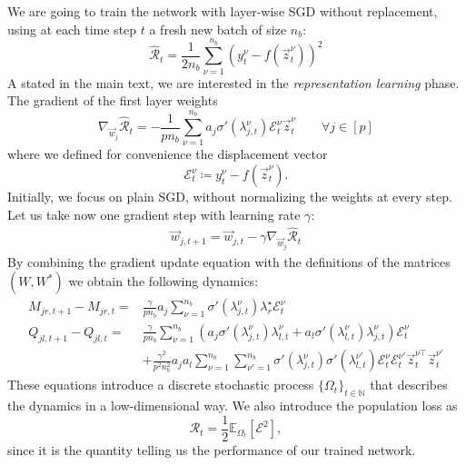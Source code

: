 We are going to train the network with layer-wise SGD without replacement, using at each time step \(t\) a fresh new batch of size $n_b$: 
\[
    \hat{\mathcal{R}}_t = \frac{1}{2n_b} \sum_{\nu=1}^{n_b}(y^\nu_t - f(\vec z^\nu_t))^2
\]
A stated in the main text, we are interested in the \emph{representation learning} phase. The gradient of the first layer weights
\[
    \nabla_{\vec w_j} \hat{\mathcal{R}}_t = -\frac{1}{pn_b} \sum_{\nu=1}^{n_b} a_j \sigma'(\lambda^\nu_{j,t})\mathcal{E}_t^\nu \vec{z}^\nu_t \qquad \forall j \in [p]
\]
where we defined for convenience the displacement vector 
\begin{equation*}
\mathcal{E}_t^{\nu} \coloneqq y^\nu_t-f{(\vec z^\nu_t)}.
\end{equation*}
Initially, we focus on plain SGD, without normalizing the weights at every step. Let us take now one gradient step with learning rate $\gamma$:
\begin{align}
    \vec w_{j,t + 1} = \vec w_{j,t } - \gamma  \nabla_{\vec w_j} \hat{\mathcal{R}}_t
    \label{2406:eq:gd_update_weight}
 \end{align}
By combining the gradient update equation with the definitions of the matrices $(W,W^*)$ we obtain the following dynamics:
\begin{equation} \label{2406:eq:ap:full_process}
\begin{aligned}
M_{jr,t+1} - M_{jr,t} =&  \frac{\gamma}{pn_b} a_j \sum_{\nu = 1}^{n_b} \sigma'(\lambda_{j,t}^\nu)\lambda^{\star}_{r} \mathcal{E}_t^{\nu} \\
Q_{jl,t+1} - Q_{jl,t} =& \frac{\gamma}{pn_b} \sum_{\nu = 1}^{n_b} \left(a_j\sigma'(\lambda_{j,t}^\nu)\lambda_{l,t}^{\nu}+a_l\sigma'(\lambda_{l,t}^\nu)\lambda_{j,t}^{\nu}\right) \mathcal{E}_t^\nu \\
    &+\frac{\gamma^2}{p^2n_b^2}a_ja_l\sum_{\nu = 1}^{n_b} \sum_{\nu' = 1}^{n_b} \sigma'(\lambda_{j,t}^\nu)\sigma'(\lambda_{l,t}^{\nu'})\mathcal{E}_t^\nu\mathcal{E}_t^{\nu'} \vec z^{\nu\top}_t \vec z_t^{\nu'}
\end{aligned}
\end{equation}
These equations introduce a discrete stochastic process \(\{\Omega_t\}_{t\in \mathbb{N}}\) that describes the dynamics in a low-dimensional way.
We also introduce the population loss as
\begin{equation*}
    \mathcal R_t = \frac12 \mathbb{E}_{\Omega_t}\left[\mathcal E^2\right],
\end{equation*}
since it is the quantity telling us the performance of our trained network.


